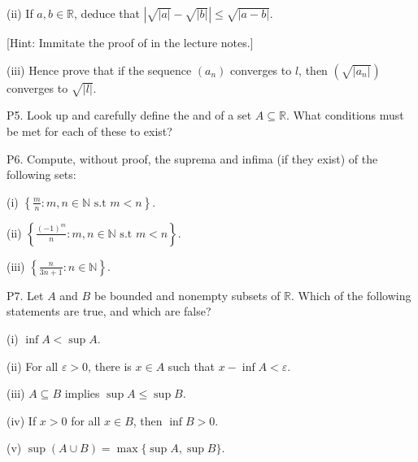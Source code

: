 \documentclass[letterpaper,10pt,english]{jupyterBook}
\begin{document}
\sphinxAtStartPar
(ii) If \(a,b \in \mathbb{R}\), deduce that \(\left|\sqrt{|a|} - \sqrt{|b|}\right| \leq \sqrt{|a - b|}\).

{[}Hint: Immitate the proof of  in the lecture notes.{]}

\sphinxAtStartPar
(iii) Hence prove that if the sequence \((a_{n})\) converges to \(l\), then \(\left(\sqrt{|a_{n}|}\right)\) converges to \(\sqrt{|l|}\).


\label{\detokenize{Problems:p5}}
\sphinxAtStartPar
P5. Look up and carefully define the  and  of a set \(A\subseteq\mathbb{R}\). What conditions must be met for each of these to exist?


\label{\detokenize{Problems:p6}}
\sphinxAtStartPar
P6. Compute, without proof, the suprema and infima (if they exist) of the following sets:

\sphinxAtStartPar
(i) \(\left\{\frac{m}{n}:m,n\in\mathbb{N} \text{ s.t } m<n\right\}\).

\sphinxAtStartPar
(ii) \(\left\{\frac{(-1)^m}{n}:m,n\in\mathbb{N} \text{ s.t } m<n\right\}\).

\sphinxAtStartPar
(iii) \(\left\{\frac{n}{3n + 1} :n\in\mathbb{N}\right\}\).


\label{\detokenize{Problems:p7}}
\sphinxAtStartPar
P7. Let \(A\) and \(B\) be bounded and non\sphinxhyphen{}empty subsets of \(\mathbb{R}\). Which of the following statements are true, and which are false?

\sphinxAtStartPar
(i) \(\inf A < \sup A\).

\sphinxAtStartPar
(ii) For all \(\varepsilon>0\), there is \(x\in A\) such that \(x-\inf A < \varepsilon\).

\sphinxAtStartPar
(iii) \(A\subseteq B\) implies \(\sup A \leq \sup B\).

\sphinxAtStartPar
(iv) If \(x>0\) for all \(x\in B\), then \(\inf B >0\).

\sphinxAtStartPar
(v) \(\sup(A\cup B) = \max\{\sup A,\sup B\}\).
\end{document}
